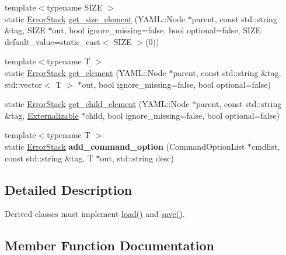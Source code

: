 \begin{DoxyCompactItemize}
\item 
{\footnotesize template$<$typename S\+I\+ZE $>$ }\\static \hyperlink{classalps_1_1ErrorStack}{Error\+Stack} \hyperlink{structalps_1_1Externalizable_a1a6df09ad89c2154cc94de784127ec1f}{get\+\_\+size\+\_\+element} (Y\+A\+M\+L\+::\+Node $\ast$parent, const std\+::string \&tag, S\+I\+ZE $\ast$out, bool ignore\+\_\+missing=false, bool optional=false, S\+I\+ZE default\+\_\+value=static\+\_\+cast$<$ S\+I\+ZE $>$(0))
\item 
{\footnotesize template$<$typename T $>$ }\\static \hyperlink{classalps_1_1ErrorStack}{Error\+Stack} \hyperlink{structalps_1_1Externalizable_a02ca000360b9ab5fc30b4cf30ade1354}{get\+\_\+element} (Y\+A\+M\+L\+::\+Node $\ast$parent, const std\+::string \&tag, std\+::vector$<$ T $>$ $\ast$out, bool ignore\+\_\+missing=false, bool optional=false)
\item 
static \hyperlink{classalps_1_1ErrorStack}{Error\+Stack} \hyperlink{structalps_1_1Externalizable_a03e9ab31323b870ba49408a9cd2720bc}{get\+\_\+child\+\_\+element} (Y\+A\+M\+L\+::\+Node $\ast$parent, const std\+::string \&tag, \hyperlink{structalps_1_1Externalizable}{Externalizable} $\ast$child, bool ignore\+\_\+missing=false, bool optional=false)
\item 
{\footnotesize template$<$typename T $>$ }\\static \hyperlink{classalps_1_1ErrorStack}{Error\+Stack} {\bfseries add\+\_\+command\+\_\+option} (Command\+Option\+List $\ast$cmdlist, const std\+::string \&tag, T $\ast$out, std\+::string desc)\hypertarget{structalps_1_1Externalizable_a6a54f3965c85284e18b2d2acdb936f59}{}\label{structalps_1_1Externalizable_a6a54f3965c85284e18b2d2acdb936f59}

\end{DoxyCompactItemize}


\subsection{Detailed Description}
Derived classes must implement \hyperlink{structalps_1_1Externalizable_a3f29cb41a5b5201a1316480087902eed}{load()} and \hyperlink{structalps_1_1Externalizable_a17a3cdc895ad343d18fd37ff6efd0aef}{save()}. 

\subsection{Member Function Documentation}
